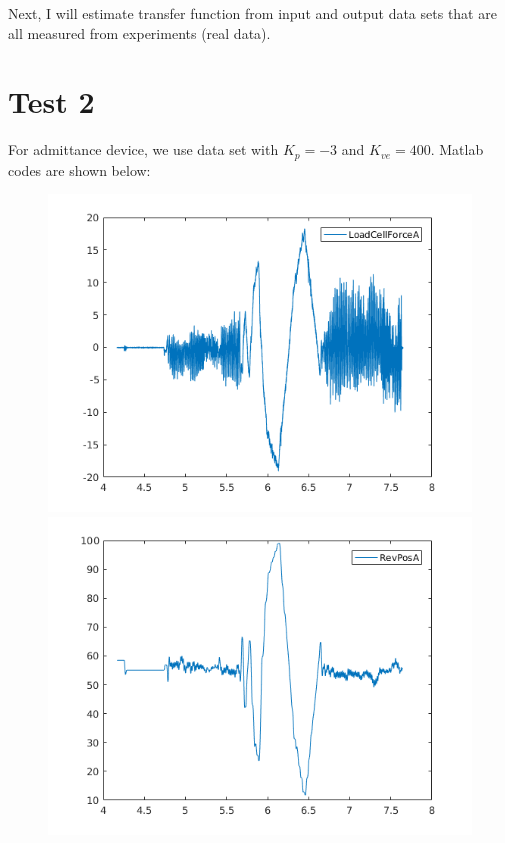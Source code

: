 \documentclass[letterpaper]{article}
\begin{document}
Next, I will estimate transfer function from input and output data sets that are all measured from experiments (real data).
\section*{Test 2}
For admittance device, we use data set with $K_p=-3$ and $K_{ve}=400$. Matlab codes are shown below:

\begin{figure}[H]
	\centering
	\includegraphics[scale=0.5]{adm_loadcellforceA.png}\includegraphics[scale=0.5]{adm_revposA.png}

\end{figure}
\end{document}
